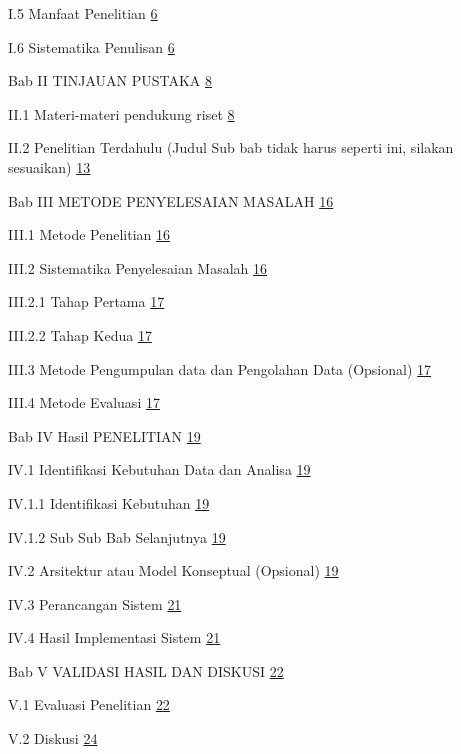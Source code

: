 I.5 Manfaat Penelitian \protect\hyperlink{manfaat-penelitian}{6}

I.6 Sistematika Penulisan \protect\hyperlink{sistematika-penulisan}{6}

Bab II TINJAUAN PUSTAKA \protect\hyperlink{tinjauan-pustaka}{8}

II.1 Materi-materi pendukung riset
\protect\hyperlink{materi-materi-pendukung-riset-judul-sub-bab-silakan-disesuaikan-tidak-harus-seperti-ini}{8}

II.2 Penelitian Terdahulu (Judul Sub bab tidak harus seperti ini,
silakan sesuaikan)
\protect\hyperlink{penelitian-terdahulu-judul-sub-bab-tidak-harus-seperti-ini-silakan-sesuaikan}{13}

Bab III METODE PENYELESAIAN MASALAH
\protect\hyperlink{metode-penyelesaian-masalah}{16}

III.1 Metode Penelitian \protect\hyperlink{metode-penelitian}{16}

III.2 Sistematika Penyelesaian Masalah
\protect\hyperlink{sistematika-penyelesaian-masalah}{16}

III.2.1 Tahap Pertama \protect\hyperlink{tahap-pertama}{17}

III.2.2 Tahap Kedua \protect\hyperlink{tahap-kedua}{17}

III.3 Metode Pengumpulan data dan Pengolahan Data (Opsional)
\protect\hyperlink{metode-pengumpulan-data-dan-pengolahan-data-opsional}{17}

III.4 Metode Evaluasi \protect\hyperlink{metode-evaluasi}{17}

Bab IV Hasil PENELITIAN \protect\hyperlink{_Toc211426853}{19}

IV.1 Identifikasi Kebutuhan Data dan Analisa
\protect\hyperlink{_Toc211426854}{19}

IV.1.1 Identifikasi Kebutuhan \protect\hyperlink{_Toc211426855}{19}

IV.1.2 Sub Sub Bab Selanjutnya \protect\hyperlink{_Toc211426856}{19}

IV.2 Arsitektur atau Model Konseptual (Opsional)
\protect\hyperlink{_Toc211426857}{19}

IV.3 Perancangan Sistem \protect\hyperlink{_Toc211426858}{21}

IV.4 Hasil Implementasi Sistem \protect\hyperlink{_Toc211426859}{21}

Bab V VALIDASI HASIL DAN DISKUSI \protect\hyperlink{_Toc211426860}{22}

V.1 Evaluasi Penelitian \protect\hyperlink{_Toc211426861}{22}

V.2 Diskusi \protect\hyperlink{_Toc211426862}{24}

